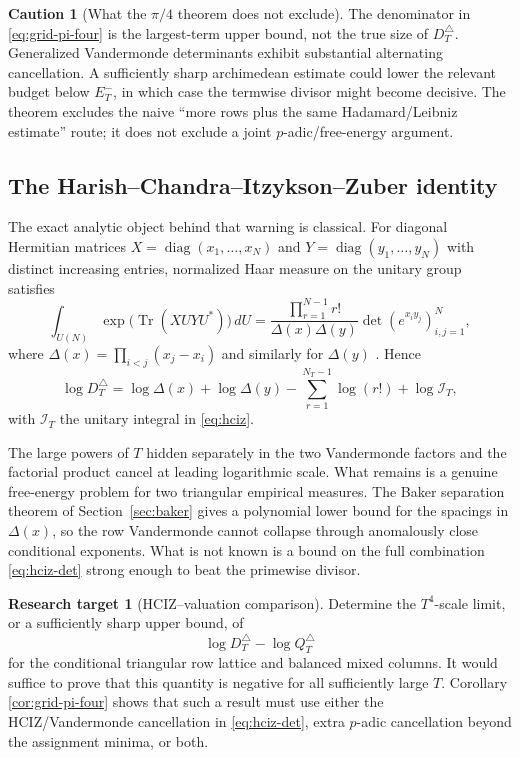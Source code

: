 \documentclass[11pt,oneside]{article}
\theoremstyle{definition}
\newtheorem{target}[theorem]{Research target}
\newtheorem{warning}[theorem]{Caution}
\theoremstyle{remark}
\begin{document}
\begin{warning}[What the $\pi/4$ theorem does not exclude]\label{warn:grid-actual}
The denominator in \eqref{eq:grid-pi-four} is the largest-term upper bound, not the true size
of $D_T^{\triangle}$.  Generalized Vandermonde determinants exhibit substantial alternating
cancellation.  A sufficiently sharp archimedean estimate could lower the relevant budget
below $E_T^-$, in which case the termwise divisor might become decisive.  The theorem excludes
the naive ``more rows plus the same Hadamard/Leibniz estimate'' route; it does not exclude a
joint $p$-adic/free-energy argument.
\end{warning}

\subsection{The Harish--Chandra--Itzykson--Zuber identity}

The exact analytic object behind that warning is classical.  For diagonal Hermitian matrices
$X=\operatorname{diag}(x_1,\ldots,x_N)$ and
$Y=\operatorname{diag}(y_1,\ldots,y_N)$ with distinct increasing entries, normalized Haar
measure on the unitary group satisfies
\begin{equation}\label{eq:hciz}
 \int_{U(N)}
   \exp\!\bigl(\operatorname{Tr}(XUYU^*)\bigr)\,dU
 =\frac{\prod_{r=1}^{N-1}r!}{\Delta(x)\Delta(y)}
   \det(e^{x_i y_j})_{i,j=1}^{N},
\end{equation}
where
$\Delta(x)=\prod_{i<j}(x_j-x_i)$ and similarly for $\Delta(y)$
\cite{HarishChandra1957,ItzyksonZuber1980,McSwiggen2018}.  Hence
\begin{equation}\label{eq:hciz-det}
 \log D_T^{\triangle}
 =\log\Delta(x)+\log\Delta(y)
  -\sum_{r=1}^{N_T-1}\log(r!)
  +\log\mathcal I_T,
\end{equation}
with $\mathcal I_T$ the unitary integral in \eqref{eq:hciz}.

The large powers of $T$ hidden separately in the two Vandermonde factors and the factorial
product cancel at leading logarithmic scale.  What remains is a genuine free-energy problem
for two triangular empirical measures.  The Baker separation theorem of
Section~\ref{sec:baker} gives a polynomial lower bound for the spacings in $\Delta(x)$, so the
row Vandermonde cannot collapse through anomalously close conditional exponents.  What is not
known is a bound on the full combination \eqref{eq:hciz-det} strong enough to beat the
primewise divisor.

\begin{target}[HCIZ--valuation comparison]\label{target:hciz}
Determine the $T^4$-scale limit, or a sufficiently sharp upper bound, of
\[
 \log D_T^{\triangle}-\log Q_T^{\triangle}
\]
for the conditional triangular row lattice and balanced mixed columns.  It would suffice to
prove that this quantity is negative for all sufficiently large $T$.  Corollary
\ref{cor:grid-pi-four} shows that such a result must use either the HCIZ/Vandermonde
cancellation in \eqref{eq:hciz-det}, extra $p$-adic cancellation beyond the assignment minima,
or both.
\end{target}
\end{document}
